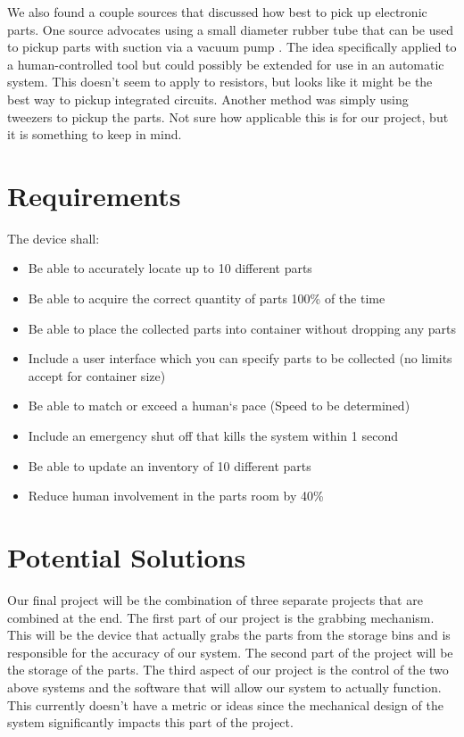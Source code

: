 \documentclass[12pt]{report}
\begin{document}
We also found a couple sources that discussed how best to pick up electronic parts. One source advocates using a small diameter rubber tube that can be used to pickup parts with suction via a vacuum pump \cite{vacuumPick}. The idea specifically applied to a human-controlled tool but could possibly be extended for use in an automatic system. This doesn't seem to apply to resistors, but looks like it might be the best way to pickup integrated circuits. Another method was simply using tweezers to pickup the parts. Not sure how applicable this is for our project, but it is something to keep in mind.

\section*{Requirements}


\noindent The device shall: \\
\begin{itemize}
\item Be able to accurately locate up to 10 different parts
\item Be able to acquire the correct quantity of parts 100\% of the time
\item Be able to place the collected parts into container without dropping any parts
\item Include a user interface which you can specify parts to be collected (no limits accept for container size)
\item Be able to match or exceed a human`s pace (Speed to be determined)
\item Include an emergency shut off that kills the system within 1 second
\item Be able to update an inventory of 10 different parts
\item Reduce human involvement in the parts room by 40\%
\end{itemize}

\section*{Potential Solutions}
Our final project will be the combination of three separate projects that are combined at the end. The first part of our project is the grabbing mechanism. This will be the device that actually grabs the parts from the storage bins and is responsible for the accuracy of our system. The second part of the project will be the storage of the parts. The third aspect of our project is the control of the two above systems and the software that will allow our system to actually function. This currently doesn't have a metric or ideas since the mechanical design of the system significantly impacts this part of the project.
\end{document}
